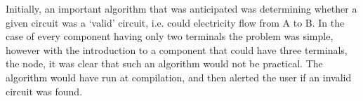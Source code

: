 


        Initially, an important algorithm that was anticipated was determining whether a given circuit was a `valid' circuit, i.e. could electricity flow from A to B. 
        In the case of every component having only two terminals the problem was simple, however with the introduction to a component that could have three terminals, the node, it was clear that such an algorithm would not be practical. 
        The algorithm would have run at compilation, and then alerted the user if an invalid circuit was found. 

